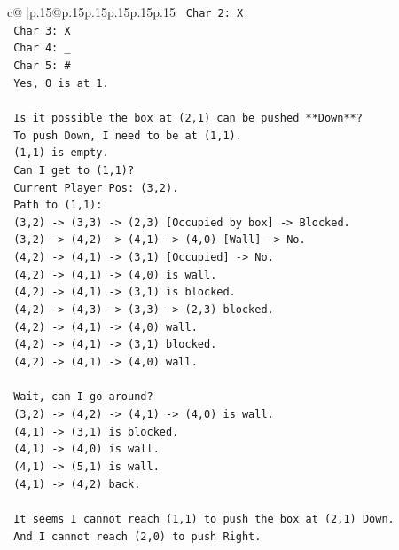 \documentclass{article}
\begin{document}
{\begin{supertabular}{c@{$\;$}|p{.15\linewidth}@{}p{.15\linewidth}p{.15\linewidth}p{.15\linewidth}p{.15\linewidth}p{.15\linewidth}}
{{{\texttt{    Char 2: X} \\
\texttt{    Char 3: X} \\
\texttt{    Char 4: \_} \\
\texttt{    Char 5: \#} \\
\texttt{    Yes, O is at 1.} \\
\\ 
\texttt{    Is it possible the box at (2,1) can be pushed **Down**?} \\
\texttt{    To push Down, I need to be at (1,1).} \\
\texttt{    (1,1) is empty.} \\
\texttt{    Can I get to (1,1)?} \\
\texttt{    Current Player Pos: (3,2).} \\
\texttt{    Path to (1,1):} \\
\texttt{    (3,2) {-}> (3,3) {-}> (2,3) {[}Occupied by box{]} {-}> Blocked.} \\
\texttt{    (3,2) {-}> (4,2) {-}> (4,1) {-}> (4,0) {[}Wall{]} {-}> No.} \\
\texttt{    (4,2) {-}> (4,1) {-}> (3,1) {[}Occupied{]} {-}> No.} \\
\texttt{    (4,2) {-}> (4,1) {-}> (4,0) is wall.} \\
\texttt{    (4,2) {-}> (4,1) {-}> (3,1) is blocked.} \\
\texttt{    (4,2) {-}> (4,3) {-}> (3,3) {-}> (2,3) blocked.} \\
\texttt{    (4,2) {-}> (4,1) {-}> (4,0) wall.} \\
\texttt{    (4,2) {-}> (4,1) {-}> (3,1) blocked.} \\
\texttt{    (4,2) {-}> (4,1) {-}> (4,0) wall.} \\
\\ 
\texttt{    Wait, can I go around?} \\
\texttt{    (3,2) {-}> (4,2) {-}> (4,1) {-}> (4,0) is wall.} \\
\texttt{    (4,1) {-}> (3,1) is blocked.} \\
\texttt{    (4,1) {-}> (4,0) is wall.} \\
\texttt{    (4,1) {-}> (5,1) is wall.} \\
\texttt{    (4,1) {-}> (4,2) back.} \\
\\ 
\texttt{    It seems I cannot reach (1,1) to push the box at (2,1) Down.} \\
\texttt{    And I cannot reach (2,0) to push Right.} \\
}}}
\end{supertabular}}
\end{document}
